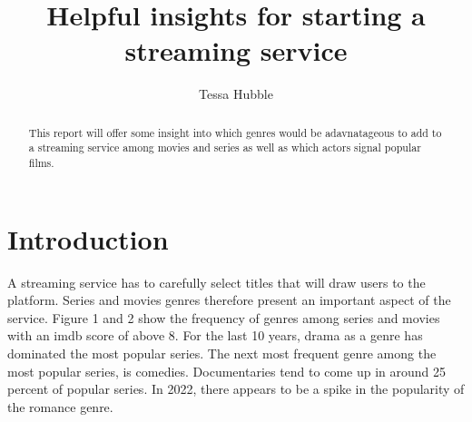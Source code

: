 \documentclass[11pt,preprint, authoryear]{elsarticle}
\numberwithin{equation}{section}
\numberwithin{figure}{section}
\numberwithin{table}{section}
\begin{document}
\begin{frontmatter}  %

\title{Helpful insights for starting a streaming service}





\author[Add1]{Tessa Hubble}





\address[Add1]{Stellenbosch University, South Africa}


\begin{abstract}
\small{
This report will offer some insight into which genres would be
adavnatageous to add to a streaming service among movies and series as
well as which actors signal popular films.
}
\end{abstract}

\vspace{1cm}





\vspace{0.5cm}

\end{frontmatter}

\setcounter{footnote}{0}



\pagestyle{fancy}
\chead{}
\rhead{}
\lfoot{}
\rfoot{}
\lhead{}
\cfoot{}


\headsep 35pt %




\hypertarget{introduction}{%
\section{\texorpdfstring{Introduction
\label{Introduction}}{Introduction }}\label{introduction}}

A streaming service has to carefully select titles that will draw users
to the platform. Series and movies genres therefore present an important
aspect of the service. Figure 1 and 2 show the frequency of genres among
series and movies with an imdb score of above 8. For the last 10 years,
drama as a genre has dominated the most popular series. The next most
frequent genre among the most popular series, is comedies. Documentaries
tend to come up in around 25 percent of popular series. In 2022, there
appears to be a spike in the popularity of the romance genre.
\end{document}
